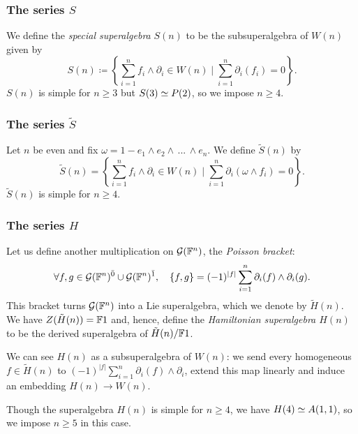 
\subsubsection{The series $S$}

We define the \emph{special superalgebra} $S(n)$ to be the subsuperalgebra of $W(n)$ given by
\[
	S(n) \coloneqq \left\{ \sum_{i=1}^{n} f_i \wedge \partial_i \in W(n) \mid
	\sum_{i=1}^{n} \partial_i (f_i) =0
	\right\}.
\]
$S(n)$ is simple for $n\geq 3$ but $S(3)\simeq P(2)$, so we impose $n\geq 4$. 

\subsubsection{The series $\tilde S$}

Let $n$ be even and fix $\omega = 1 - e_1\wedge e_2\wedge \, ...\, \wedge e_n$. We define $\tilde S(n)$ by
\[
	\tilde S(n) = \left\{ \sum_{i=1}^{n} f_i \wedge \partial_i \in W(n) \mid
	\sum_{i=1}^{n} \partial_i (\omega \wedge f_i) =0
	\right\}.
\]
$\tilde S(n)$ is simple for $n\geq 4$.

\subsubsection{The series $H$}

Let us define another multiplication on $\mathcal G(\mathbb{F}^n)$, the \emph{Poisson bracket}:
\[
    \forall f,g \in \mathcal G(\mathbb{F}^n)^{\bar0} \cup \mathcal G(\mathbb{F}^n)^{\bar1}, \quad
	\{f,g\}=(-1)^{|f|} \sum_{i=1}^{n} \partial_i(f)\wedge \partial_i(g).
\]
This bracket turns $\mathcal G(\mathbb{F}^n)$ into a Lie superalgebra, which we denote by $\tilde{H}(n)$. 
We have $Z(\tilde{H}(n)) = \mathbb{F}1$ and, hence, define the \emph{Hamiltonian superalgebra $H(n)$} to be the derived superalgebra of $\tilde{H}(n)/\mathbb{F} 1$. 

We can see $H(n)$ as a subsuperalgebra of $W(n)$: we send every homogeneous ${f\in \tilde H(n)}$ to $(-1)^{|f|}\sum_{i=1}^n \partial_i(f) \wedge \partial_i$, extend this map linearly and induce an embedding $H(n) \to W(n)$. 

Though the superalgebra $H(n)$ is simple for $n\geq 4$, we have $H(4)\simeq A(1,1)$, so we impose $n\geq 5$ in this case.

